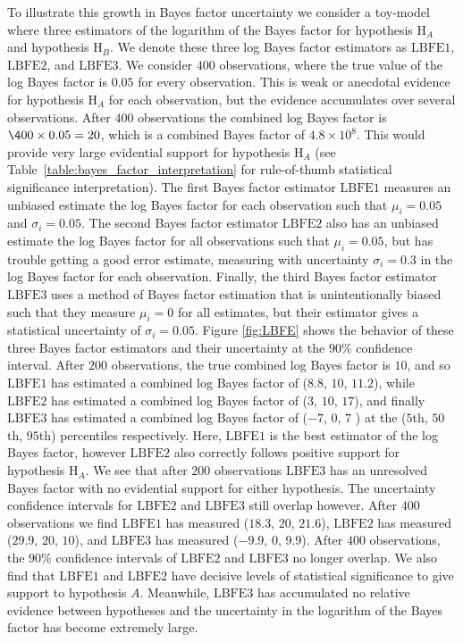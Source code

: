 To illustrate this growth in Bayes factor uncertainty we consider a toy-model where three estimators of the logarithm of the Bayes factor for hypothesis $\mathrm{H}_A$ and hypothesis $\mathrm{H}_B$. We denote these three log Bayes factor estimators as $\mathrm{LBFE1}$, $\mathrm{LBFE2}$, and $\mathrm{LBFE3}$. We consider $400$ observations, where the true value of the log Bayes factor is $0.05$ for every observation. This is weak or anecdotal evidence for hypothesis $\mathrm{H}_A$ for each observation, but the evidence accumulates over several observations. After $400$ observations the combined log Bayes factor is $\400 \times 0.05 = 20$, which is a combined Bayes factor of $4.8 \times 10^8$. This would provide very large evidential support for hypothesis $\mathrm{H}_A$ (see Table~\ref{table:bayes_factor_interpretation} for rule-of-thumb statistical significance interpretation). The first Bayes factor estimator $\mathrm{LBFE1}$ measures an unbiased estimate the log Bayes factor for each observation such that $\mu_i = 0.05$ and $\sigma_i = 0.05$. The second Bayes factor estimator $\mathrm{LBFE2}$ also has an unbiased estimate the log Bayes factor for all observations such that $\mu_i = 0.05$, but has trouble getting a good error estimate, measuring with uncertainty $\sigma_i = 0.3$ in the log Bayes factor for each observation. Finally, the third Bayes factor estimator $\mathrm{LBFE3}$ uses a method of Bayes factor estimation that is unintentionally biased such that they measure $\mu_i=0$ for all estimates, but their estimator gives a statistical uncertainty of $\sigma_i = 0.05$. Figure \ref{fig:LBFE} shows the behavior of these three Bayes factor estimators and their uncertainty at the $90 \%$ confidence interval. After $200$ observations, the true combined log Bayes factor is $10$, and so $\mathrm{LBFE1}$ has estimated a combined log Bayes factor of ($8.8$, $10$, $11.2$), while $\mathrm{LBFE2}$ has estimated a combined log Bayes factor of ($3$, $10$, $17$), and finally $\mathrm{LBFE3}$ has estimated a combined log Bayes factor of ($-7$, $0$, $7$ )  at the ($5$th, $50$th, $95$th) percentiles respectively. Here, $\mathrm{LBFE1}$ is the best estimator of the log Bayes factor, however $\mathrm{LBFE2}$ also correctly follows positive support for hypothesis $\mathrm{H}_A$. We see that after $200$ observations $\mathrm{LBFE3}$ has an unresolved Bayes factor with no evidential support for either hypothesis. The uncertainty confidence intervals for $\mathrm{LBFE2}$ and $\mathrm{LBFE3}$ still overlap however. After $400$ observations we find $\mathrm{LBFE1}$ has measured ($18.3$, $20$, $21.6$), $\mathrm{LBFE2}$ has measured ($29.9$, $20$, $10$), and $\mathrm{LBFE3}$ has measured ($-9.9$, $0$, $9.9$). After $400$ observations, the $90 \%$ confidence intervals of $\mathrm{LBFE2}$ and $\mathrm{LBFE3}$ no longer overlap. We also find that $\mathrm{LBFE1}$ and $\mathrm{LBFE2}$ have decisive levels of statistical significance to give support to hypothesis $A$. Meanwhile, $\mathrm{LBFE3}$ has accumulated no relative evidence between hypotheses and the uncertainty in the logarithm of the Bayes factor has become extremely large. 

